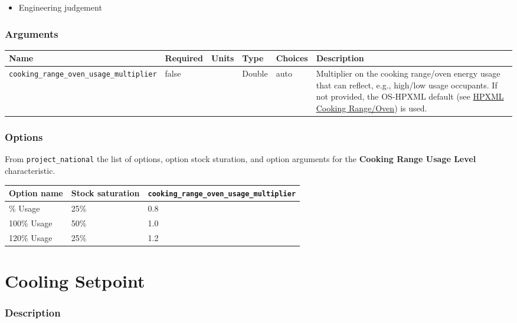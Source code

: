 \begin{itemize}
 
\item
  Engineering judgement
\end{itemize}

\subsubsection{Arguments}\label{arguments-12}

\begin{longtable}[]{@{}llllll@{}}
\toprule\noalign{}
Name & Required & Units & Type & Choices & Description \\
\midrule\noalign{}
\endhead
\bottomrule\noalign{}
\endlastfoot
\texttt{cooking\_range\_oven\_usage\_multiplier} & false & & Double &
auto & Multiplier on the cooking range/oven energy usage that can
reflect, e.g., high/low usage occupants. If not provided, the OS-HPXML
default (see
\href{https://openstudio-hpxml.readthedocs.io/en/v1.7.0/workflow_inputs.html\#hpxml-cooking-range-oven}{HPXML
Cooking Range/Oven}) is used. \\
\end{longtable}

\subsubsection{Options}\label{options-21}

From \texttt{project\_national} the list of options, option stock
sturation, and option arguments for the \textbf{Cooking Range Usage
Level} characteristic.

\begin{longtable}[]{@{}lll@{}}
\toprule\noalign{}
Option name & Stock saturation &
\texttt{cooking\_range\_oven\_usage\_multiplier} \\
\midrule\noalign{}
\endhead
\bottomrule\noalign{}
\endlastfoot
80\% Usage & 25\% & 0.8 \\
100\% Usage & 50\% & 1.0 \\
120\% Usage & 25\% & 1.2 \\
\end{longtable}

\section{Cooling Setpoint}\label{cooling_setpoint}

\subsubsection{Description}\label{description-22}


